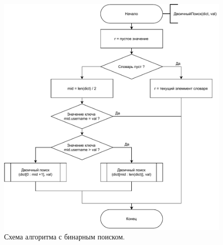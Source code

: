 \documentclass[12pt]{report}
\begin{document}
	\begin{figure}[H]
		\begin{center}
			\includegraphics[scale=0.8]{img/bin_scheme.pdf}
			\caption{Схема алгоритма с бинарным поиском.}
			\label{fig:alg2}
		\end{center}
	\end{figure}
	
\end{document}
